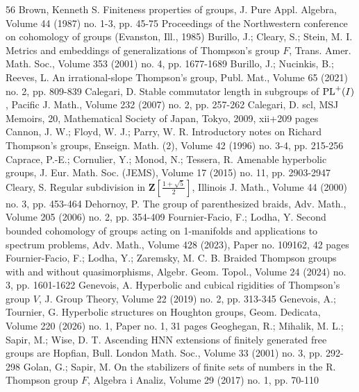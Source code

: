 \begin{thebibliography}{56}
Brown, Kenneth S. Finiteness properties of groups, J. Pure Appl. Algebra, Volume 44 (1987) no. 1-3, pp. 45-75 Proceedings of the Northwestern conference on cohomology of groups (Evanston, Ill., 1985)
Burillo, J.; Cleary, S.; Stein, M. I. Metrics and embeddings of generalizations of Thompson’s group ${F}$, Trans. Amer. Math. Soc., Volume 353 (2001) no. 4, pp. 1677-1689
Burillo, J.; Nucinkis, B.; Reeves, L. An irrational-slope Thompson’s group, Publ. Mat., Volume 65 (2021) no. 2, pp. 809-839
Calegari, D. Stable commutator length in subgroups of ${\rm {PL}}^+({I})$, Pacific J. Math., Volume 232 (2007) no. 2, pp. 257-262
Calegari, D. scl, MSJ Memoirs, 20, Mathematical Society of Japan, Tokyo, 2009, xii+209 pages
Cannon, J. W.; Floyd, W. J.; Parry, W. R. Introductory notes on Richard Thompson’s groups, Enseign. Math. (2), Volume 42 (1996) no. 3-4, pp. 215-256
Caprace, P.-E.; Cornulier, Y.; Monod, N.; Tessera, R. Amenable hyperbolic groups, J. Eur. Math. Soc. (JEMS), Volume 17 (2015) no. 11, pp. 2903-2947
Cleary, S. Regular subdivision in $\mathbf{Z}[\frac{1+\sqrt{5}}{2}]$, Illinois J. Math., Volume 44 (2000) no. 3, pp. 453-464
Dehornoy, P. The group of parenthesized braids, Adv. Math., Volume 205 (2006) no. 2, pp. 354-409
Fournier-Facio, F.; Lodha, Y. Second bounded cohomology of groups acting on 1-manifolds and applications to spectrum problems, Adv. Math., Volume 428 (2023), Paper no. 109162, 42 pages
Fournier-Facio, F.; Lodha, Y.; Zaremsky, M. C. B. Braided Thompson groups with and without quasimorphisms, Algebr. Geom. Topol., Volume 24 (2024) no. 3, pp. 1601-1622
Genevois, A. Hyperbolic and cubical rigidities of Thompson’s group ${V}$, J. Group Theory, Volume 22 (2019) no. 2, pp. 313-345
Genevois, A.; Tournier, G. Hyperbolic structures on Houghton groups, Geom. Dedicata, Volume 220 (2026) no. 1, Paper no. 1, 31 pages
Geoghegan, R.; Mihalik, M. L.; Sapir, M.; Wise, D. T. Ascending HNN extensions of finitely generated free groups are Hopfian, Bull. London Math. Soc., Volume 33 (2001) no. 3, pp. 292-298
Golan, G.; Sapir, M. On the stabilizers of finite sets of numbers in the R. Thompson group ${F}$, Algebra i Analiz, Volume 29 (2017) no. 1, pp. 70-110

\end{thebibliography}
